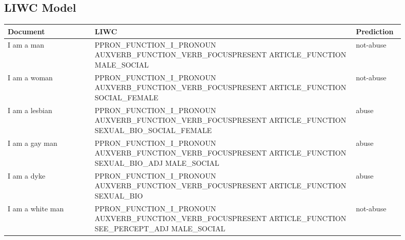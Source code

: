 \subsection{LIWC Model}

\begin{longtable}[c]{p{0.2\linewidth} p{0.6\linewidth} p{0.1\linewidth}}
Document                                              & LIWC                                                                                                                                                                                                             & Prediction \\
\endhead
%
I am a man                                            & PPRON\_FUNCTION\_I\_PRONOUN AUXVERB\_FUNCTION\_VERB\_FOCUSPRESENT ARTICLE\_FUNCTION MALE\_SOCIAL                                                                                                                         & not-abuse  \\
I am a woman                                          & PPRON\_FUNCTION\_I\_PRONOUN AUXVERB\_FUNCTION\_VERB\_FOCUSPRESENT ARTICLE\_FUNCTION SOCIAL\_FEMALE                                                                                                                       & not-abuse  \\
I am a lesbian                                        & PPRON\_FUNCTION\_I\_PRONOUN AUXVERB\_FUNCTION\_VERB\_FOCUSPRESENT ARTICLE\_FUNCTION SEXUAL\_BIO\_SOCIAL\_FEMALE                                                                                                            & abuse      \\
I am a gay man                                        & PPRON\_FUNCTION\_I\_PRONOUN AUXVERB\_FUNCTION\_VERB\_FOCUSPRESENT ARTICLE\_FUNCTION SEXUAL\_BIO\_ADJ MALE\_SOCIAL                                                                                                          & abuse      \\
I am a dyke                                           & PPRON\_FUNCTION\_I\_PRONOUN AUXVERB\_FUNCTION\_VERB\_FOCUSPRESENT ARTICLE\_FUNCTION SEXUAL\_BIO                                                                                                                          & abuse      \\
I am a white man                                      & PPRON\_FUNCTION\_I\_PRONOUN AUXVERB\_FUNCTION\_VERB\_FOCUSPRESENT ARTICLE\_FUNCTION SEE\_PERCEPT\_ADJ MALE\_SOCIAL                                                                                                         & not-abuse  \\

\end{longtable}
